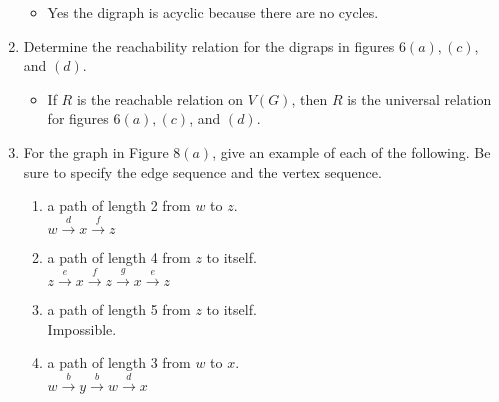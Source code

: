 \documentclass[11pt]{article}
\begin{document}
\begin{enumerate}
	\begin{itemize}
	\item Yes the digraph is acyclic because there are no cycles.
	\end{itemize}
\setcounter{enumi}{7}
\item Determine the reachability relation for the digraps in figures $6(a),(c)$, and $(d)$.
	\begin{itemize}
	\item If $R$ is the reachable relation on $V(G)$, then $R$ is the universal relation for figures $6(a),(c)$, and $(d)$.
	\end{itemize}
\setcounter{enumi}{15}
\item For the graph in Figure $8(a)$, give an example of each of the following. Be sure to specify the edge sequence 
and the vertex sequence.
	\begin{enumerate}
	\item a path of length 2 from $w$ to $z$.\\
	$w\xrightarrow{d} x\xrightarrow{f}z$
	\item a path of length 4 from $z$ to itself.\\
	$z\xrightarrow{e} x\xrightarrow{f} z\xrightarrow{g} x\xrightarrow{e}z$
	\item a path of length 5 from $z$ to itself.\\
	Impossible.
	\item a path of length 3 from $w$ to $x$.\\
	$w\xrightarrow{b} y\xrightarrow{b} w\xrightarrow{d} x$
	\end{enumerate}
\end{enumerate}

\end{document}
